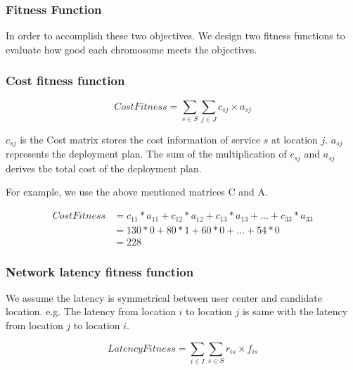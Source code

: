 \documentclass{llncs}
\begin{document}
\subsubsection{Fitness Function}

\begin{flushleft}In order to accomplish these two objectives. We design two fitness functions to evaluate 
how good each chromosome meets the objectives.\end{flushleft}
\subsubsection{Cost fitness function}
\begin{center}
	\begin{equation}
		CostFitness = \sum\limits_{s \in S} \sum\limits_{j \in J} c_{sj} \times a_{sj}
	\end{equation}
\end{center}

$c_{sj}$ is the Cost matrix stores the cost information of service $s$ at location $j$. $a_{sj}$ represents the deployment plan. The sum of the multiplication of 
$c_{sj}$ and $a_{sj}$ derives the total cost of the deployment plan.


\begin{flushleft}For example, we use the above mentioned matrices C and A.\end{flushleft}

\begin{align*}
	CostFitness &= c_{11} * a_{11} + c_{12} * a_{12} + c_{13} * a_{13} + ... + c_{33} * a_{33} \\
	&= 130 * 0 + 80 * 1 + 60 * 0 + ... + 54 * 0 \\
	&= 228
\end{align*}
\subsubsection{Network latency fitness function}

We assume the latency is symmetrical between user center and candidate location. e.g. 
The latency from location $i$ to location $j$ is same with the latency from location $j$ to location $i$.

\begin{center}
	\begin{equation}
		LatencyFitness = \sum\limits_{i \in I} \sum\limits_{s \in S} r_{is} \times f_{is}
	\end{equation}
\end{center}
\end{document}
